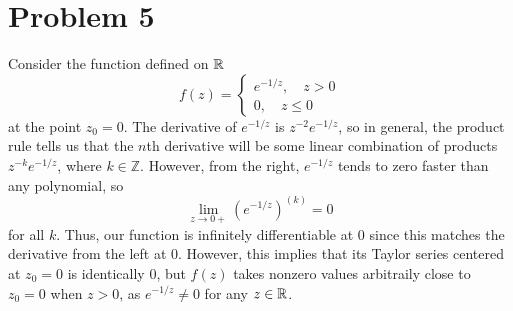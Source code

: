 \documentclass{article}
\begin{document}
\section{Problem 5}
Consider the function defined on $\mathbb{R}$
\[
f(z)=\begin{cases}
e^{-1/z},\quad z>0\\
0, \quad z\leq0
\end{cases}
\]
at the point $z_0=0$. The derivative of $e^{-1/z}$ is $z^{-2}e^{-1/z}$, so in general, the product rule tells us that the $n$th derivative will be some linear combination of products $z^{-k}e^{-1/z}$, where $k\in\mathbb{Z}$. However, from the right, $e^{-1/z}$ tends to zero faster than any polynomial, so
\[
\lim_{z\to0+}\left(e^{-1/z}\right)^{(k)}=0
\]
for all $k$. Thus, our function is infinitely differentiable at $0$ since this matches the derivative from the left at 0. However, this implies that its Taylor series centered at $z_0=0$ is identically 0, but $f(z)$ takes nonzero values arbitraily close to $z_0=0$ when $z>0$, as $e^{-1/z}\neq0$ for any $z\in\mathbb{R}$. 
\end{document}
